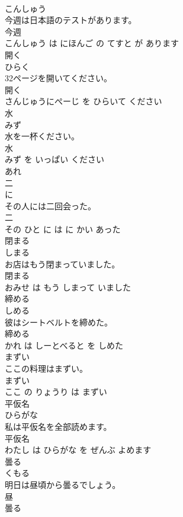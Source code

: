 \documentclass[8pt]{extreport}
\begin{document}
\begin{CJK}{UTF8}{min}
\\	こんしゅう			
\\	今週は日本語のテストがあります。	
\\	今週 
\\	こんしゅう は にほんご の てすと が あります			
\\	開く	
\\	ひらく			
\\	32ページを開いてください。	
\\	開く 
\\	さんじゅうにぺーじ を ひらいて ください			
\\	水	
\\	みず			
\\	水を一杯ください。	
\\	水 
\\	みず を いっぱい ください			
\\	あれ	
\\	二	
\\	に			
\\	その人には二回会った。	
\\	二 
\\	その ひと に は に かい あった			
\\	閉まる	
\\	しまる			
\\	お店はもう閉まっていました。	
\\	閉まる 
\\	おみせ は もう しまって いました			
\\	締める	
\\	しめる			
\\	彼はシートベルトを締めた。	
\\	締める 
\\	かれ は しーとべると を しめた			
\\	まずい	
\\	ここの料理はまずい。	
\\	まずい 
\\	ここ の りょうり は まずい			
\\	平仮名	
\\	ひらがな			
\\	私は平仮名を全部読めます。	
\\	平仮名 
\\	わたし は ひらがな を ぜんぶ よめます			
\\	曇る	
\\	くもる			
\\	明日は昼頃から曇るでしょう。	
\\	昼 
\\	曇る 

\end{CJK}
\end{document}
